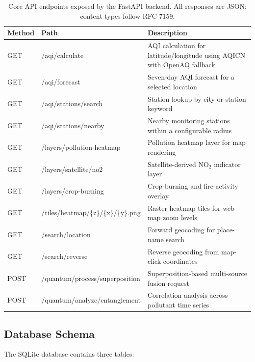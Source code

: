 \documentclass[12pt,a4paper]{article}
\begin{document}
\begin{table}[H]
\centering
\caption[Core API endpoints]{Core API endpoints exposed by the FastAPI backend.
All responses are JSON; content types follow RFC 7159.}
\label{tab:endpoints}
\begin{tabular}{@{}llp{9.2cm}@{}}
\toprule
\textbf{Method} & \textbf{Path} & \textbf{Description} \\
\midrule
GET  & /aqi/calculate & AQI calculation for latitude/longitude using AQICN with OpenAQ fallback \\
GET  & /aqi/forecast & Seven-day AQI forecast for a selected location \\
GET  & /aqi/stations/search & Station lookup by city or station keyword \\
GET  & /aqi/stations/nearby & Nearby monitoring stations within a configurable radius \\
GET  & /layers/pollution-heatmap & Pollution heatmap layer for map rendering \\
GET  & /layers/satellite/no2 & Satellite-derived NO$_2$ indicator layer \\
GET  & /layers/crop-burning & Crop-burning and fire-activity overlay \\
GET  & /tiles/heatmap/\{z\}/\{x\}/\{y\}.png & Raster heatmap tiles for web-map zoom levels \\
GET  & /search/location & Forward geocoding for place-name search \\
GET  & /search/reverse & Reverse geocoding from map-click coordinates \\
POST & /quantum/process/superposition & Superposition-based multi-source fusion request \\
POST & /quantum/analyze/entanglement & Correlation analysis across pollutant time series \\
\bottomrule
\end{tabular}
\end{table}

\subsection{Database Schema}
\label{sec:sysdesign:db}

The SQLite database contains three tables:
\end{document}
